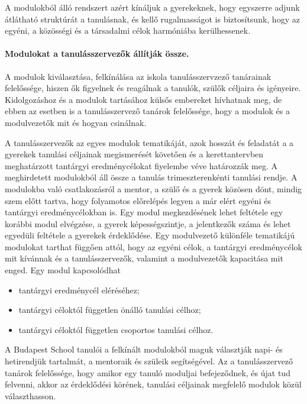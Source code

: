 A modulokból álló rendszert azért kínáljuk a gyerekeknek, hogy egyszerre adjunk átlátható struktúrát a tanulásnak, és kellő rugalmasságot is biztosítsunk, hogy az egyéni, a közösségi és a társadalmi célok harmóniába kerülhessenek.


\paragraph{Modulokat a tanulásszervezők állítják össze.}

A modulok kiválasztása, felkínálása az iskola tanulásszervzező tanárainak felelőssége, hiszen ők figyelnek és reagálnak a tanulók, szülők céljaira és igényeire. Kidolgozáshoz és a modulok tartásához külsős embereket hívhatnak meg, de ebben az esetben is a tanulásszervező tanárok felelőssége, hogy a modulok és a modulvezetők mit és hogyan csinálnak.

A tanulásszervezők az egyes modulok tematikáját, azok hosszát és feladatát a a gyerekek tanulási céljainak megismerését követően és a kerettantervben meghatárzott tantárgyi eredménycélokat fiyelembe véve határozzák meg. A meghirdetett modulokból áll össze a tanulás trimeszterenkénti tanulási rendje. A modulokba való csatlakozásról a mentor, a szülő és a gyerek közösen dönt, mindig szem előtt tartva, hogy folyamotos előrelépés legyen a már elért egyéni és tantárgyi eredménycélokban is. Egy modul megkezdésének lehet feltétele egy korábbi modul elvégzése, a gyerek képességszintje, a jelentkezők száma és lehet egyedüli feltétele a gyerekek érdeklődése. Egy modulvezető különféle tematikájú modulokat tarthat függően attól, hogy az egyéni célok, a tantárgyi eredménycélok mit kívánnak és a tanulásszervezők, valamint a modulvezetők kapacitása mit enged. Egy modul kapcsolódhat

   \begin{itemize}

\item tantárgyi eredménycél eléréséhez;
\item tantárgyi céloktól független önálló tanulási célhoz;
\item tantárgyi céloktól független csoportos tanulási célhoz.
\end{itemize}

A Budapest School tanulói a felkínált modulokból maguk választják napi- és hetirendjük tartalmát, a mentoraik és szüleik segítségével. Az a tanulásszervező tanárok felelőssége, hogy amikor egy tanuló moduljai befejeződnek, és újat tud felvenni, akkor az érdeklődési körének, tanulási céljainak megfelelő modulok közül választhasson.

